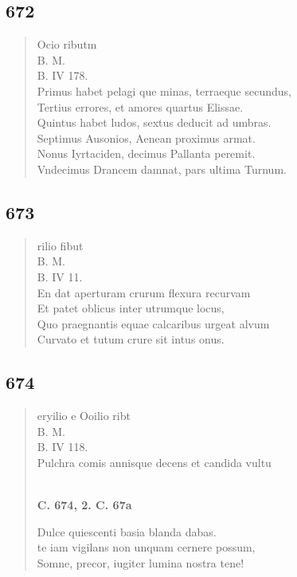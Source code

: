 \documentclass[11pt, a4paper]{report}
\begin{document}
            \subsection*{672}
      \begin{verse}
      Ocio ributm \\ B. M. \\ B. IV 178. \\ Primus habet pelagi \lbrack que \rbrack  minas, terraeque secundus, \\ Tertius errores, et amores quartus Elissae. \\ Quintus habet ludos, sextus deducit ad umbras. \\ Septimus Ausonios, Aenean proximus armat. \\ Nonus Iyrtaciden, decimus Pallanta peremit. \\ Vndecimus Drancem damnat, pars ultima Turnum. \\ 
      \end{verse}
  
            \subsection*{673}
      \begin{verse}
      rilio fibut \\ B. M. \\ B. IV 11. \\ En dat aperturam crurum flexura recurvam \\ Et patet oblicus inter utrumque locus, \\ Quo praegnantis equae calcaribus urgeat alvum \\ Curvato et tutum crure sit intus onus. \\ 
      \end{verse}
  
            \subsection*{674}
      \begin{verse}
      eryilio e Ooilio ribt \\ B. M. \\ B. IV 118. \\ Pulchra comis annisque decens et candida vultu \\ 
        ﻿\pagebreak 
     \marginpar{[150]} \begin{center} \textbf{C. 674, 2. C. 67a} \end{center}Dulce quiescenti basia blanda dabas. \\ te iam vigilans non unquam cernere possum, \\ Somne, precor, iugiter lumina nostra tene! \\ 
      \end{verse}
  
\end{document}
